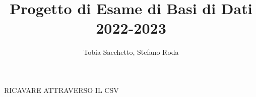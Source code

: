 
\title{Progetto di Esame di Basi di Dati 2022-2023}
\author{Tobia Sacchetto, Stefano Roda}
\begin{introduction}
    RICAVARE ATTRAVERSO IL CSV
    
\end{introduction}


